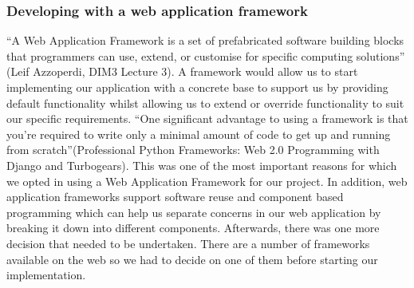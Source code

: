 \documentclass{l3proj}
\begin{document}
\subsubsection{Developing with a web application framework}
``A Web Application Framework is a set of prefabricated software building blocks that 
programmers can use, extend, or customise for specific computing solutions'' (Leif 
Azzoperdi, DIM3 Lecture 3). A framework would allow us to start implementing our 
application with a concrete base to support us by providing default functionality whilst 
allowing us to extend or override functionality to suit our specific requirements. ``One 
significant advantage to using a framework is that you're required to write only a 
minimal amount of code to get up and running from scratch''(Professional Python 
Frameworks: Web 2.0 Programming with Django and Turbogears). This was 
one of the most important reasons for which we opted in using a Web Application 
Framework for our project. In addition, web application frameworks support software reuse and component based programming which can help us separate concerns in our web application by breaking it down into different components. Afterwards, there was one more decision that needed to be 
undertaken. There are a number of frameworks available on the web so we had to decide 
on one of them before starting our implementation. 
\end{document}
